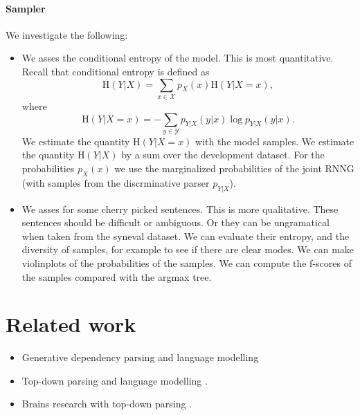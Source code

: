 \paragraph{Sampler} We investigate the following:
\begin{itemize}
  \item We asses the conditional entropy of the model. This is most quantitative. Recall that conditional entropy is defined as
  \begin{equation}
    \text{H}(Y|X) = \sum_{x \in \mathcal{X}} p_X(x)\text{H}(Y|X = x),
  \end{equation}
  where
  \begin{equation}
    \text{H}(Y|X = x) = - \sum_{y \in \mathcal{Y}} p_{Y|X}(y|x) \log p_{Y|X}(y|x).
  \end{equation}
  We estimate the quantity $\text{H}(Y|X = x)$ with the model samples. We estimate the quantity $\text{H}(Y|X)$ by a sum over the development dataset. For the probabilities $p_X(x)$ we use the marginalized probabilities of the joint RNNG (with samples from the discrminative parser $p_{Y|X}$).
  \item We asses for some cherry picked sentences. This is more qualitative. These sentences should be difficult or ambiguous. Or they can be ungramatical when taken from the syneval dataset. We can evaluate their entropy, and the diversity of samples, for example to see if there are clear modes. We can make violinplots of the probabilities of the samples. We can compute the f-scores of the samples compared with the argmax tree.
\end{itemize}


\section{Related work}
\begin{itemize}
  \item Generative dependency parsing and language modelling \citep{Buys+2015:bayes-gen-dep,Buys+2015:neural-gen-dep,Buys+2018}
  \item Top-down parsing and language modelling \citep{Roark2001}.
  \item Brains research with top-down parsing \citep{Hale+2018:beam,Brennan+2016}.
\end{itemize}
